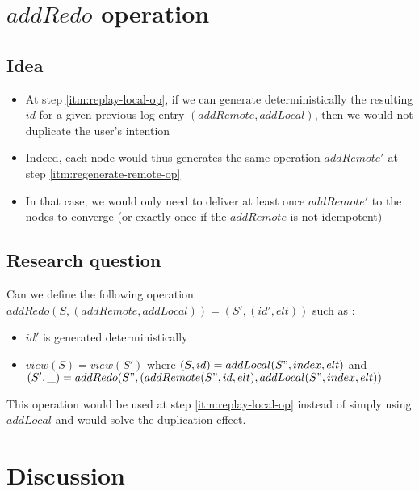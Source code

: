 \documentclass[a4paper]{article}
\begin{document}
\section{$addRedo$ operation}

\subsection{Idea}

\begin{itemize}
  \item At step \ref{itm:replay-local-op}, if we can generate deterministically the resulting $id$
    for a given previous log entry $(addRemote, addLocal)$, then we would not duplicate the user's intention
  \item Indeed, each node would thus generates the same operation $addRemote'$ at step \ref{itm:regenerate-remote-op}
  \item In that case, we would only need to deliver at least once $addRemote'$ to the nodes to converge
    (or exactly-once if the $addRemote$ is not idempotent)
\end{itemize}

\subsection{Research question}

Can we define the following operation $addRedo(S, (addRemote, addLocal)) = (S', (id', elt))$ such as :
\begin{itemize}
  \item $id'$ is generated deterministically
  \item $view(S) = view(S')$
    where $(S, id) = addLocal(S", index, elt)$
    and $(S', \_) = addRedo(S", (addRemote(S", id, elt), addLocal(S", index, elt))$
\end{itemize}
This operation would be used at step \ref{itm:replay-local-op} instead of simply using $addLocal$
and would solve the duplication effect.

\section{Discussion}
\end{document}
